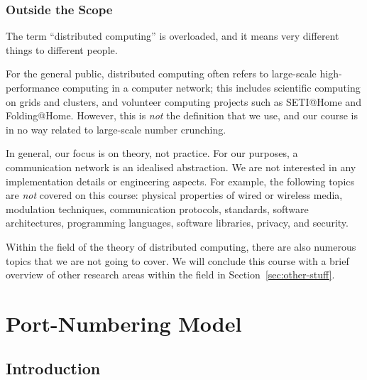 \subsection{Outside the Scope}

The term ``distributed computing'' is overloaded, and it means very different things to different people.

For the general public, distributed computing often refers to large-scale high-performance computing in a computer network; this includes scientific computing on grids and clusters, and volunteer computing projects such as SETI@Home and Folding@Home. However, this is \emph{not} the definition that we use, and our course is in no way related to large-scale number crunching.

In general, our focus is on theory, not practice. For our purposes, a communication network is an idealised abstraction. We are not interested in any implementation details or engineering aspects. For example, the following topics are \emph{not} covered on this course: physical properties of wired or wireless media, modulation techniques, communication protocols, standards, software architectures, programming languages, software libraries, privacy, and security.

Within the field of the theory of distributed computing, there are also numerous topics that we are not going to cover. We will conclude this course with a brief overview of other research areas within the field in Section~\ref{sec:other-stuff}.


\chapter{Port-Numbering Model}

\section{Introduction}

